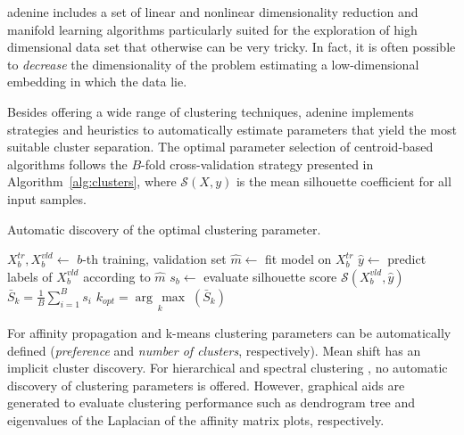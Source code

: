 \documentclass[twoside,11pt]{article}
\makeatletter
\newcommand{\argmax}[1]{\underset{#1}{\operatorname{arg}\,\operatorname{max}}\;}
\newcommand{\ade}{{\sc adenine}\@\xspace}
\makeatother
\begin{document}
\ade includes a set of linear and nonlinear dimensionality reduction and manifold learning algorithms particularly suited for the exploration of high dimensional data set that otherwise can be very tricky. In fact, it is often possible to \emph{decrease} the dimensionality of the problem estimating a low-dimensional embedding in which the data lie.

Besides offering a wide range of clustering techniques,
\ade implements strategies and heuristics to automatically estimate parameters that yield the most suitable cluster separation.
The optimal parameter selection of centroid-based algorithms follows the $B$-fold cross-validation strategy presented in Algorithm~\ref{alg:clusters}, where $\mathcal{S}(X,y)$ is the mean silhouette coefficient \citep{rousseeuw1987silhouettes} for all input samples.

\begin{algorithm}[]
    \small
    \caption{Automatic discovery of the optimal clustering parameter.}\label{alg:clusters}
    \label{alg:clusters}
    \begin{algorithmic}[1]
              \State $X^{tr}_b,X^{vld}_b\leftarrow$ $b$-th training, validation set
              \State $\hat{m}\leftarrow$ fit model on $X^{tr}_b$
              \State $\hat{y}\leftarrow$ predict labels of $X^{vld}_b$ according to $\hat{m}$
              \State $s_b\leftarrow$ evaluate silhouette score  $\mathcal{S}(X^{vld}_b,\hat{y})$
        \EndFor
        \State $\bar{S}_k = \frac{1}{B}\sum_{i=1}^B s_i$
        \EndFor
        \State $k_{opt} = \argmax{k}(\bar{S}_k)$
    \end{algorithmic}
\end{algorithm}

For affinity propagation \citep{frey2007clustering} and k-means \citep{bishop2006pattern} clustering parameters can be automatically defined (\emph{preference} and \emph{number of clusters}, respectively).
Mean shift \citep{comaniciu2002mean} has an implicit cluster discovery.
For hierarchical \citep{friedman2001elements} and spectral clustering \citep{shi2000normalized}, no automatic discovery of clustering parameters is offered. However, graphical aids are generated to evaluate clustering performance such as dendrogram tree and eigenvalues of the Laplacian of the affinity matrix plots, respectively.
\end{document}
